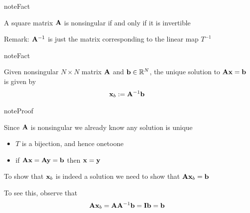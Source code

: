 \documentclass[letterpaper,10pt,english]{jupyterBook}
\begin{document}
\begin{sphinxadmonition}{note}{Fact}

\sphinxAtStartPar
A square matrix \({\bf A}\) is nonsingular if and only if it is invertible
\end{sphinxadmonition}

\sphinxAtStartPar
Remark: \({\bf A}^{-1}\) is just the matrix corresponding to the linear map \(T^{-1}\)

\begin{sphinxadmonition}{note}{Fact}

\sphinxAtStartPar
Given nonsingular \(N \times N\) matrix \({\bf A}\) and \({\bf b} \in \mathbb{R}^N\), the unique solution to \({\bf A} {\bf x} = {\bf b}\) is given by
\begin{equation*}
\begin{split} {\bf x}_b := {\bf A}^{-1} {\bf b} \end{split}
\end{equation*}\end{sphinxadmonition}

\begin{sphinxadmonition}{note}{Proof}

\sphinxAtStartPar
Since \({\bf A}\) is nonsingular we already know any solution is
unique
\begin{itemize}
\item {} 
\sphinxAtStartPar
\(T\) is a bijection, and hence one\sphinxhyphen{}to\sphinxhyphen{}one

\item {} 
\sphinxAtStartPar
if \({\bf A} {\bf x} = {\bf A} {\bf y} = {\bf b}\) then \({\bf x} = {\bf y}\)

\end{itemize}

\sphinxAtStartPar
To show that \({\bf x}_b\) is indeed a solution we need to show that
\({\bf A} {\bf x}_b = {\bf b}\)

\sphinxAtStartPar
To see this, observe that
\begin{equation*}
\begin{split}
%
{\bf A} {\bf x}_b = {\bf A} {\bf A}^{-1} {\bf b} = {\bf I} {\bf b} = {\bf b}
%
\end{split}
\end{equation*}\end{sphinxadmonition}
\end{document}
